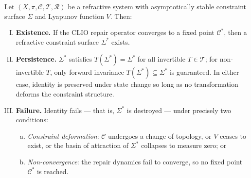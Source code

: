 \documentclass[11pt,openany]{book}
\begin{document}
\begin{theorem}
\label{thm:refractive-identity}
Let $(X, \pi, \mathcal{C}, \mathcal{T}, \mathcal{R})$ be a
refractive system with asymptotically stable constraint
surface $\Sigma$ and Lyapunov function $V$.  Then:
\begin{enumerate}[(I)]
  \item \textbf{Existence.}\; If the CLIO repair operator
    converges to a fixed point $\mathcal{C}^*$, then a
    refractive constraint surface $\Sigma^*$ exists.

  \item \textbf{Persistence.}\; $\Sigma^*$ satisfies
    $T(\Sigma^*) = \Sigma^*$ for all invertible
    $T \in \mathcal{T}$; for non-invertible $T$, only
    forward invariance $T(\Sigma^*) \subseteq \Sigma^*$ is
    guaranteed.  In either case, identity is preserved under
    state change so long as no transformation deforms the
    constraint structure.

  \item \textbf{Failure.}\; Identity fails --- that is,
    $\Sigma^*$ is destroyed --- under precisely two
    conditions:
    \begin{enumerate}[(a)]
      \item \emph{Constraint deformation}: $\mathcal{C}$
        undergoes a change of topology, or $V$ ceases to
        exist, or the basin of attraction of $\Sigma^*$
        collapses to measure zero; or
      \item \emph{Non-convergence}: the repair dynamics
        fail to converge, so no fixed point $\mathcal{C}^*$
        is reached.
    \end{enumerate}
\end{enumerate}
\end{theorem}
\end{document}
